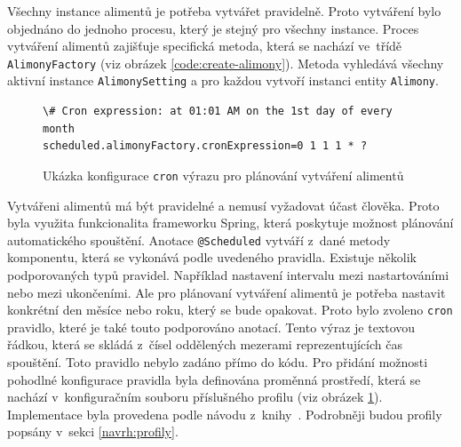             Všechny instance alimentů je potřeba vytvářet pravidelně. Proto vytváření bylo objednáno do jednoho procesu, který je stejný pro všechny instance. Proces vytváření alimentů zajišťuje specifická metoda, která se nachází ve~třídě \verb|AlimonyFactory| (viz obrázek \ref{code:create-alimony}). Metoda vyhledává všechny aktivní instance \verb|AlimonySetting| a pro každou vytvoří instanci entity \verb|Alimony|. 
            
            \begin{figure}
                \begin{verbatim}
\# Cron expression: at 01:01 AM on the 1st day of every month
scheduled.alimonyFactory.cronExpression=0 1 1 1 * ?
                \end{verbatim}
                \caption{Ukázka konfigurace \texttt{cron} výrazu pro plánování vytváření alimentů} 
                \label{code:cron-expression}
            \end{figure}
            Vytvářeni alimentů má být pravidelné a nemusí vyžadovat účast člověka. Proto byla využita funkcionalita frameworku Spring, která poskytuje možnost plánování automatického spouštění.\cite{spring-scheduling} Anotace \verb|@Scheduled| vytváří z~dané metody komponentu, která se vykonává podle uvedeného pravidla. Existuje několik podporovaných typů pravidel. 
            Například nastavení intervalu mezi nastartováními nebo mezi ukončeními. Ale pro plánovaní vytváření alimentů je potřeba nastavit konkrétní den měsíce nebo roku, který se bude opakovat. Proto bylo zvoleno \verb|cron| pravidlo, které je také touto podporováno anotací.\cite{cron-expression} Tento výraz je textovou řádkou, která se skládá z~čísel oddělených mezerami reprezentujících čas spouštění.
            Toto pravidlo nebylo zadáno přímo do kódu. Pro přidání možnosti pohodlné konfigurace pravidla byla definována proměnná prostředí, která se nachází v~konfiguračním souboru příslušného profilu (viz obrázek \ref{code:cron-expression}). Implementace byla provedena podle návodu z~knihy~\cite{sbr:spring-task-scheduling}. Podrobněji budou profily popsány v~sekci \ref{navrh:profily}.
         
